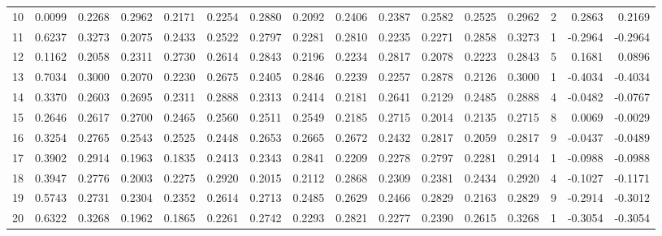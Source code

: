 \begin{tabular}{lrrrrrrrrrrrrrrr}
10  &      0.0099 &  0.2268 &  0.2962 &  0.2171 &  0.2254 &  0.2880 &  0.2092 &  0.2406 &  0.2387 &  0.2582 &   0.2525 &     0.2962 &      2 &                    0.2863 &                     0.2169 \\
11  &      0.6237 &  0.3273 &  0.2075 &  0.2433 &  0.2522 &  0.2797 &  0.2281 &  0.2810 &  0.2235 &  0.2271 &   0.2858 &     0.3273 &      1 &                   -0.2964 &                    -0.2964 \\
12  &      0.1162 &  0.2058 &  0.2311 &  0.2730 &  0.2614 &  0.2843 &  0.2196 &  0.2234 &  0.2817 &  0.2078 &   0.2223 &     0.2843 &      5 &                    0.1681 &                     0.0896 \\
13  &      0.7034 &  0.3000 &  0.2070 &  0.2230 &  0.2675 &  0.2405 &  0.2846 &  0.2239 &  0.2257 &  0.2878 &   0.2126 &     0.3000 &      1 &                   -0.4034 &                    -0.4034 \\
14  &      0.3370 &  0.2603 &  0.2695 &  0.2311 &  0.2888 &  0.2313 &  0.2414 &  0.2181 &  0.2641 &  0.2129 &   0.2485 &     0.2888 &      4 &                   -0.0482 &                    -0.0767 \\
15  &      0.2646 &  0.2617 &  0.2700 &  0.2465 &  0.2560 &  0.2511 &  0.2549 &  0.2185 &  0.2715 &  0.2014 &   0.2135 &     0.2715 &      8 &                    0.0069 &                    -0.0029 \\
16  &      0.3254 &  0.2765 &  0.2543 &  0.2525 &  0.2448 &  0.2653 &  0.2665 &  0.2672 &  0.2432 &  0.2817 &   0.2059 &     0.2817 &      9 &                   -0.0437 &                    -0.0489 \\
17  &      0.3902 &  0.2914 &  0.1963 &  0.1835 &  0.2413 &  0.2343 &  0.2841 &  0.2209 &  0.2278 &  0.2797 &   0.2281 &     0.2914 &      1 &                   -0.0988 &                    -0.0988 \\
18  &      0.3947 &  0.2776 &  0.2003 &  0.2275 &  0.2920 &  0.2015 &  0.2112 &  0.2868 &  0.2309 &  0.2381 &   0.2434 &     0.2920 &      4 &                   -0.1027 &                    -0.1171 \\
19  &      0.5743 &  0.2731 &  0.2304 &  0.2352 &  0.2614 &  0.2713 &  0.2485 &  0.2629 &  0.2466 &  0.2829 &   0.2163 &     0.2829 &      9 &                   -0.2914 &                    -0.3012 \\
20  &      0.6322 &  0.3268 &  0.1962 &  0.1865 &  0.2261 &  0.2742 &  0.2293 &  0.2821 &  0.2277 &  0.2390 &   0.2615 &     0.3268 &      1 &                   -0.3054 &                    -0.3054 \\

\end{tabular}
